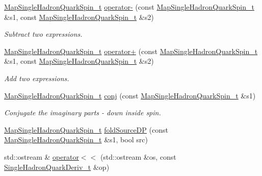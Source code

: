 \begin{DoxyCompactItemize}
\mbox{\hyperlink{namespaceHadron_a22279e56b59508dc8dd2c8991dc911fd}{Map\+Single\+Hadron\+Quark\+Spin\+\_\+t}} \mbox{\hyperlink{namespaceHadron_a47e695607c9fe7e70da22c43d0065b91}{operator-\/}} (const \mbox{\hyperlink{namespaceHadron_a22279e56b59508dc8dd2c8991dc911fd}{Map\+Single\+Hadron\+Quark\+Spin\+\_\+t}} \&s1, const \mbox{\hyperlink{namespaceHadron_a22279e56b59508dc8dd2c8991dc911fd}{Map\+Single\+Hadron\+Quark\+Spin\+\_\+t}} \&s2)
\begin{DoxyCompactList}\small\item\em Subtract two expressions. \end{DoxyCompactList}\item 
\mbox{\hyperlink{namespaceHadron_a22279e56b59508dc8dd2c8991dc911fd}{Map\+Single\+Hadron\+Quark\+Spin\+\_\+t}} \mbox{\hyperlink{namespaceHadron_a9ca80acd77b748f912b330709f8c294a}{operator+}} (const \mbox{\hyperlink{namespaceHadron_a22279e56b59508dc8dd2c8991dc911fd}{Map\+Single\+Hadron\+Quark\+Spin\+\_\+t}} \&s1, const \mbox{\hyperlink{namespaceHadron_a22279e56b59508dc8dd2c8991dc911fd}{Map\+Single\+Hadron\+Quark\+Spin\+\_\+t}} \&s2)
\begin{DoxyCompactList}\small\item\em Add two expressions. \end{DoxyCompactList}\item 
\mbox{\hyperlink{namespaceHadron_a22279e56b59508dc8dd2c8991dc911fd}{Map\+Single\+Hadron\+Quark\+Spin\+\_\+t}} \mbox{\hyperlink{namespaceHadron_a5b62c8e194d4e04483d980199eff43fa}{conj}} (const \mbox{\hyperlink{namespaceHadron_a22279e56b59508dc8dd2c8991dc911fd}{Map\+Single\+Hadron\+Quark\+Spin\+\_\+t}} \&s1)
\begin{DoxyCompactList}\small\item\em Conjugate the imaginary parts -\/ down inside spin. \end{DoxyCompactList}\item 
\mbox{\hyperlink{namespaceHadron_a22279e56b59508dc8dd2c8991dc911fd}{Map\+Single\+Hadron\+Quark\+Spin\+\_\+t}} \mbox{\hyperlink{namespaceHadron_a3ea046027140669df443a45763de3e2c}{fold\+Source\+DP}} (const \mbox{\hyperlink{namespaceHadron_a22279e56b59508dc8dd2c8991dc911fd}{Map\+Single\+Hadron\+Quark\+Spin\+\_\+t}} \&s1, bool src)
\item 
std\+::ostream \& \mbox{\hyperlink{namespaceHadron_af6547a2cdd6369eda030067e469096bf}{operator$<$$<$}} (std\+::ostream \&os, const \mbox{\hyperlink{structHadron_1_1SingleHadronQuarkDeriv__t}{Single\+Hadron\+Quark\+Deriv\+\_\+t}} \&op)
\item 

\end{DoxyCompactItemize}
